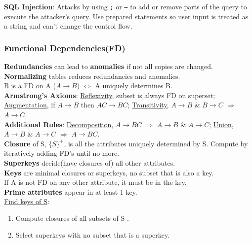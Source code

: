 \begin{multicols*}{3}
\noindent\textbf{SQL Injection}: Attacks by using \texttt{;} or \texttt{--} to add or remove parts of the query to execute the attacker's query. Use prepared statements so user input is treated as a string and can't change the control flow.\\

\subsubsection{Functional Dependencies(FD)}
\textbf{Redundancies} can lead to \textbf{anomalies} if not all copies are changed.\\
\textbf{Normalizing} tables reduces redundancies and anomalies.\\
B is a FD on A ($A\rightarrow B$) $\Leftrightarrow$ A uniquely determines B.\\
\textbf{Armstrong's Axioms}: \underline{Reflexivity}, subset is always FD on superset; \underline{Augmentation}, if $A\rightarrow B$ then $AC\rightarrow BC$; \underline{Transitivity}, $A\rightarrow B$ \& $B\rightarrow C$ $\Rightarrow$ $A\rightarrow C$.\\
\textbf{Additional Rules}: \underline{Decomposition}, $A\rightarrow BC$ $\Rightarrow$ $A\rightarrow B$ \& $A\rightarrow C$; \underline{Union},  $A\rightarrow B$ \& $A\rightarrow C$ $\Rightarrow$ $A\rightarrow BC$.\\
\textbf{Closure} of S, $\{S\}^+$, is all the attributes uniquely determined by S. Compute by iteratively adding FD's until no more.\\
\textbf{Superkeys} decide(have closures of) all other attributes.\\
\textbf{Keys} are minimal closures or superkeys, no subset that is also a key.\\
If A is not FD on any other attribute, it must be in the key.\\
\textbf{Prime attributes} appear in at least 1 key.\\ 
\underline{Find keys of S}: 
\begin{enumerate}[leftmargin=*]
    \item Compute closures of all subsets of S .
    \item Select superkeys with no subset that is a superkey.\\
\end{enumerate}


\end{multicols*}
